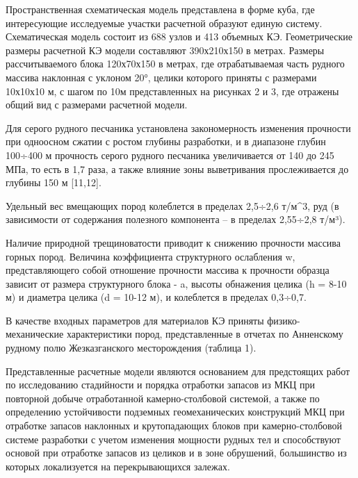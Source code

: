\begin{multicols}{2}

Пространственная схематическая модель представлена в форме куба, где
интересующие исследуемые участки расчетной образуют единую систему.
Схематическая модель состоит из 688 узлов и 413 объемных КЭ.
Геометрические размеры расчетной КЭ модели составляют 390х210х150 в
метрах. Размеры рассчитываемого блока 120х70х150 в метрах, где
отрабатываемая часть рудного массива наклонная с уклоном 20°, целики
которого приняты с размерами 10х10х10 м, с шагом по 10м представленных
на рисунках 2 и 3, где отражены общий вид с размерами расчетной модели.

Для серого рудного песчаника установлена закономерность изменения
прочности при одноосном сжатии с ростом глубины разработки, и в
диапазоне глубин 100÷400 м прочность серого рудного песчаника
увеличивается от 140 до 245 МПа, то есть в 1,7 раза, а также влияние
зоны выветривания прослеживается до глубины 150 м {[}11,12{]}.

Удельный вес вмещающих пород колеблется в пределах 2,5÷2,6 т/м\^{}3, руд
(в зависимости от содержания полезного компонента -- в пределах 2,55÷2,8
т/м³).

Наличие природной трещиноватости приводит к снижению прочности массива
горных пород. Величина коэффициента структурного ослабления w,
представляющего собой отношение прочности массива к прочности образца
зависит от размера структурного блока - a, высоты обнажения целика (h =
8-10 м) и диаметра целика (d = 10-12 м), и колеблется в пределах
0,3÷0,7.

В качестве входных параметров для материалов КЭ приняты
физико-механические характеристики пород, представленные в отчетах по
Анненскому рудному полю Жезказганского месторождения (таблица 1).

Представленные расчетные модели являются основанием для предстоящих
работ по исследованию стадийности и порядка отработки запасов из МКЦ при
повторной добыче отработанной камерно-столбовой системой, а также по
определению устойчивости подземных геомеханических конструкций МКЦ при
отработке запасов наклонных и крутопадающих блоков при камерно-столбовой
системе разработки с учетом изменения мощности рудных тел и способствуют
основой при отработке запасов из целиков и в зоне обрушений, большинство
из которых локализуется на перекрывающихся залежах.
\end{multicols}



